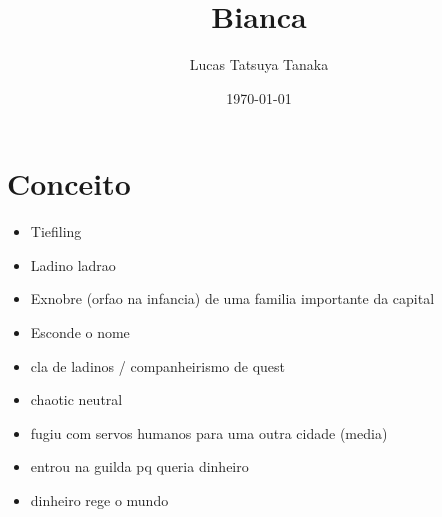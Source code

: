\documentclass{book}
\title{Bianca}
\author{Lucas Tatsuya Tanaka}
\date{\today}
\begin{document}
\maketitle
\tableofcontents

\chapter{Conceito}
\begin{itemize}
    \item Tiefiling 
    \item Ladino ladrao
    \item Exnobre (orfao na infancia) de uma familia importante da capital
    \item Esconde o nome 
    \item cla de ladinos / companheirismo de quest 
    \item chaotic neutral 
    \item fugiu com servos humanos para uma outra cidade (media)
    \item entrou  na guilda pq queria dinheiro
    \item dinheiro rege o mundo 
\end{itemize}
\end{document}
